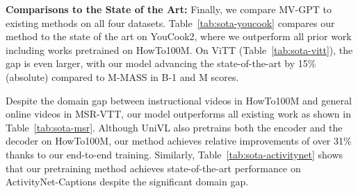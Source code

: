 \documentclass[10pt,twocolumn,letterpaper]{article}
\begin{document}

\noindent\textbf{Comparisons to the State of the Art:} 
Finally, we compare MV-GPT to existing methods on all four datasets.
Table~\ref{tab:sota-youcook} compares our method to the state of the art on YouCook2, where we outperform all prior work including works pretrained on HowTo100M. 
On ViTT (Table~\ref{tab:sota-vitt}), the gap is even larger, with our model advancing the state-of-the-art by 15\% (absolute) compared to M-MASS in B-1 and M scores. 

Despite the domain gap between instructional videos in HowTo100M and general online videos in MSR-VTT, our model outperforms all existing work as shown in Table~\ref{tab:sota-msr}.
Although UniVL also pretrains both the encoder and the decoder on HowTo100M, our method achieves relative improvements of over 31\% thanks to our end-to-end training. 
Similarly, Table~\ref{tab:sota-activitynet} shows that our pretraining method achieves state-of-the-art performance on ActivityNet-Captions despite the significant domain gap.
\end{document}
